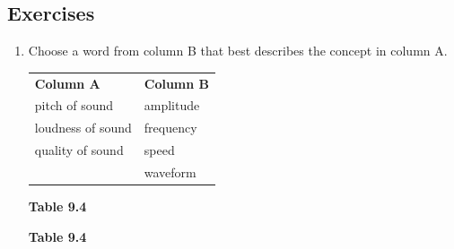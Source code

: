             \subsection{ Exercises}
            \nopagebreak
      \label{m38800*id185882}\begin{enumerate}[noitemsep, label=\textbf{\arabic*}. ] 
            \label{m38800*uid27}\item Choose a word from column B that best describes the concept in column A.
          \begin{table}[H]
        \begin{center}
      \label{m38800*id185898}
    \noindent
      \tablelasttail{}
      \begin{xtabular}[t]{|l|l|}\hline
        \textbf{Column A} &
        \textbf{Column B}%
     \tabularnewline{}
        pitch of sound &
        amplitude%
     \tabularnewline{}
        loudness of sound &
        frequency%
     \tabularnewline{}
        quality of sound &
        speed%
     \tabularnewline{}
         &
        waveform%
     \tabularnewline{}
    \end{xtabular}
      \end{center}
    \begin{center}{\small\bfseries Table 9.4}\end{center}
    \begin{caption}{\small\bfseries Table 9.4}\end{caption}
\end{table}
    \par

\end{enumerate}
